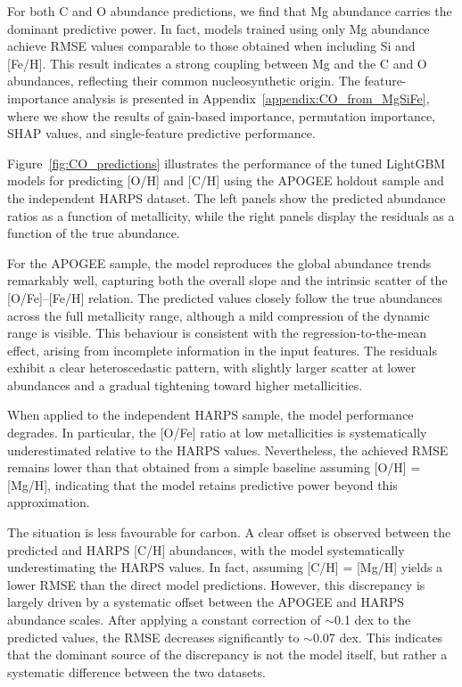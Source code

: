\documentclass{aa}
\begin{document}
For both C and O abundance predictions, we find that Mg abundance carries the dominant predictive power. In fact, models trained using only Mg abundance achieve RMSE values comparable to those obtained when including Si and [Fe/H]. This result indicates a strong coupling between Mg and the C and O abundances, reflecting their common nucleosynthetic origin. The feature-importance analysis is presented in Appendix~\ref{appendix:CO_from_MgSiFe}, where we show the results of gain-based importance, permutation importance, SHAP values, and single-feature predictive performance.

Figure~\ref{fig:CO_predictions} illustrates the performance of the tuned LightGBM models for predicting [O/H] and [C/H] using the APOGEE holdout sample and the independent HARPS dataset. The left panels show the predicted abundance ratios as a function of metallicity, while the right panels display the residuals as a function of the true abundance.

For the APOGEE sample, the model reproduces the global abundance trends remarkably well, capturing both the overall slope and the intrinsic scatter of the [O/Fe]--[Fe/H] relation. The predicted values closely follow the true abundances across the full metallicity range, although a mild compression of the dynamic range is visible. This behaviour is consistent with the regression-to-the-mean effect, arising from incomplete information in the input features. The residuals exhibit a clear heteroscedastic pattern, with slightly larger scatter at lower abundances and a gradual tightening toward higher metallicities.

When applied to the independent HARPS sample, the model performance degrades. In particular, the [O/Fe] ratio at low metallicities is systematically underestimated relative to the HARPS values. Nevertheless, the achieved RMSE remains lower than that obtained from a simple baseline assuming [O/H] = [Mg/H], indicating that the model retains predictive power beyond this approximation.

The situation is less favourable for carbon. A clear offset is observed between the predicted and HARPS [C/H] abundances, with the model systematically underestimating the HARPS values. In fact, assuming [C/H] = [Mg/H] yields a lower RMSE than the direct model predictions. However, this discrepancy is largely driven by a systematic offset between the APOGEE and HARPS abundance scales. After applying a constant correction of $\sim$0.1 dex to the predicted values, the RMSE decreases significantly to $\sim$0.07 dex. This indicates that the dominant source of the discrepancy is not the model itself, but rather a systematic difference between the two datasets.
\end{document}
